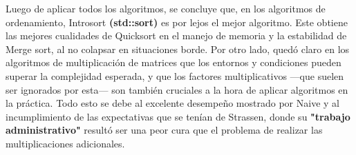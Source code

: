 Luego de aplicar todos los algoritmos, se concluye que, en los algoritmos de ordenamiento, Introsort \textbf{(std::sort)} es por lejos el mejor algoritmo. Este obtiene las mejores cualidades de Quicksort en el manejo de memoria y la estabilidad de Merge sort, al no colapsar en situaciones borde. Por otro lado, quedó claro en los algoritmos de multiplicación de matrices que los entornos y condiciones pueden superar la complejidad esperada, y que los factores multiplicativos —que suelen ser ignorados por esta— son también cruciales a la hora de aplicar algoritmos en la práctica. Todo esto se debe al excelente desempeño mostrado por Naive y al incumplimiento de las expectativas que se tenían de Strassen, donde su \textbf{"trabajo administrativo"} resultó ser una peor cura que el problema de realizar las multiplicaciones adicionales.